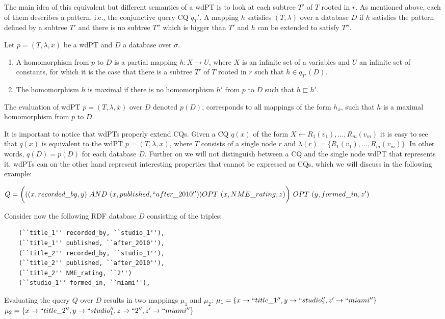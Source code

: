 The main idea of this equivalent but different semantics of a wdPT is to look at each subtree $T'$ of
$T$ rooted in $r$. As mentioned above, each of them describes a pattern, i.e.,
the conjunctive query CQ $q_T'$. A mapping $h$ satisfies $(T,\lambda)$ over
a database $D$ if $h$ satisfies the pattern defined by a subtree $T'$ and there
is no subtree $T''$ which is bigger than $T'$ and $h$ can be extended to satisfy
$T''$.
\begin{definition}
	Let $p=(T,\lambda,\overline{x})$ be a wdPT and $D$ a database over $\sigma$.

	\begin{enumerate}
		\item A homomorphism from $p$ to $D$ is a partial mapping $h: X \rightarrow U$,
			where $X$ is an infinite set of a variables and $U$ an infinite set of
			constants, for which it is the case that there is a subtree $T'$ of $T$ rooted
			in $r$ such that $h \in q_{T'}(D)$.
		\item The homomorphism $h$ is maximal if there is no homomorphism $h'$ from $p$
			to $D$ such that $h \sqsubset h'$.
	\end{enumerate}
	The evaluation of wdPT $p = (T,\lambda,\overline{x})$ over $D$ denoted $p(D)$,
	corresponds to all mappings of the form $h_{\overline{x}}$, such that $h$ is a
	maximal homomorphism from $p$ to $D$.
\end{definition}

It is important to notice that wdPTs properly extend CQs.
Given a CQ $q(x)$ of the form $X \leftarrow R_1(v_1),\dots,R_m(v_m)$
it is easy to see that $q(x)$ is equivalent to the wdPT $p = (T,\lambda,x)$,
where $T$ consists of a single node $r$ and $\lambda(r) =
\{R_1(v_1),\dots,R_m(v_m)\}$. In other words, $q(D) = p(D)$ for each database
$D$. Further on we will not distinguish between a CQ and the single node wdPT
that represents it. wdPTs can on the other hand represent interesting properties
that cannot be expressed as CQs, which we will discuss in the following example:
\begin{example}
	$Q =  \bigg(((x,recorded\_by,y) \ AND \ (x,published, ``after\_2010'')) \ \\ OPT \ (x,
	NME\_rating,z)\bigg) \ OPT \ (y, formed\_in, z') $

	\noindent Consider now the following RDF database $D$ consisting of the triples:
	\begin{verbatim}
	(``title_1'' recorded_by, ``studio_1''),
	(``title_1'' published, ``after_2010''),
	(``title_2'' recorded_by, ``studio_1''),
	(``title_2'' published, ``after_2010''),
	(``title_2'' NME_rating, ``2'')
	(``studio_1'' formed_in, ``miami''),
	\end{verbatim}
	Evaluating the query $Q$ over $D$ results in two mappings $\mu_1$ and $\mu_2$:
	$\mu_1 = \{ x \rightarrow ``title\_1'', y \rightarrow ``studio_1'',z'
	\rightarrow ``miami'' \}$ 
	$\mu_2 = \{ x \rightarrow ``title\_2'', y \rightarrow ``studio_1'',z\rightarrow
	``2'', z' \rightarrow ``miami'' \}$ 
\end{example}

